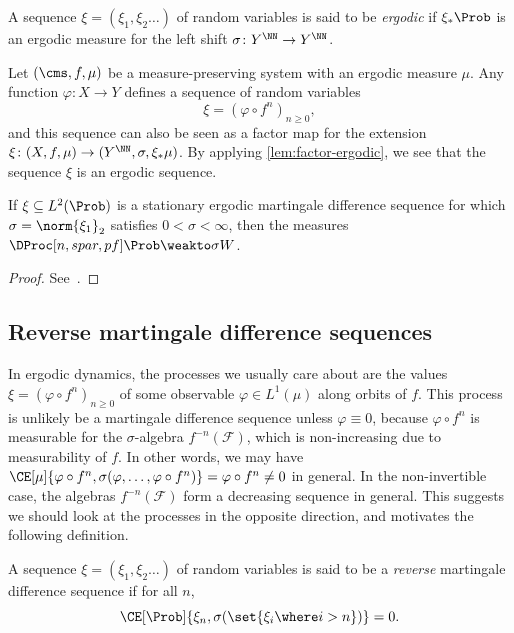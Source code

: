 \documentclass[../main]{subfiles}
\begin{document}
\begin{definition}
  A sequence \(\xi = (\xi_1,\xi_2\dots)\) of random variables is said to be \emph{ergodic} if \(\xi_*\Prob\) is an ergodic measure for the left shift \(\sigma \colon Y^{\NN} \to Y^{\NN}\). 
\end{definition}

\begin{example}
  Let \((\cms, f, \mu)\) be a measure-preserving system with an ergodic measure \(\mu\). Any function \(\varphi \colon X \to Y\) defines a sequence of random variables \[\xi = (\varphi \circ f^{n})_{n \ge 0},\]
  and this sequence can also be seen as a factor map for the extension \(\xi \colon (X,f,\mu) \to (Y^{\NN}, \sigma, \xi_*\mu)\). By applying \cref{lem:factor-ergodic}, we see that the sequence \(\xi\) is an ergodic sequence.
\end{example}

\begin{theorem}\label{thm:donsker-martingale}
  If \(\xi \subseteq L^2(\Prob)\) is a stationary ergodic martingale difference sequence for which \(\sigma = \norm{\xi_1}_2\) satisfies \(0 < \sigma < \infty\), then the measures \(\DProc[n, spar, pf] \Prob \weakto \sigma W\).
\end{theorem}

\begin{proof}
  See~\cite[Theorem 18.3]{billingsleyConvergenceProbabilityMeasures1999}.
\end{proof}

\subsection{Reverse martingale difference sequences}

In ergodic dynamics, the processes we usually care about are the values \(\xi = (\varphi \circ f^{n})_{n \geq 0}\) of some observable \(\varphi \in L^1(\mu)\) along orbits of \(f\). This process is unlikely be a martingale difference sequence unless \(\varphi \equiv 0\), because \(\varphi \circ f^n\) is measurable for the \(\sigma\)-algebra \(f^{-n}(\mathcal{F})\), which is non-increasing due to measurability of \(f\). In other words, we may have \(\CE[\mu]{\varphi \circ f^{n}, {\sigma(\varphi, \dots, \varphi \circ f^{n})}} = \varphi \circ f^{n} \neq 0\) in general. In the non-invertible case, the algebras \(f^{-n}(\mathcal{F})\) form a decreasing sequence in general. This suggests we should look at the processes in the opposite direction, and motivates the following definition.
\begin{definition}
  A sequence \(\xi = (\xi_1,\xi_2\dots)\) of random variables is said to be a \textit{reverse} martingale difference sequence if for all \(n\),
  \begin{equation*}
    \CE[\Prob]{\xi_{n}, {\sigma(\set{\xi_i \where i > n})}} = 0.
  \end{equation*}
\end{definition}
\end{document}
